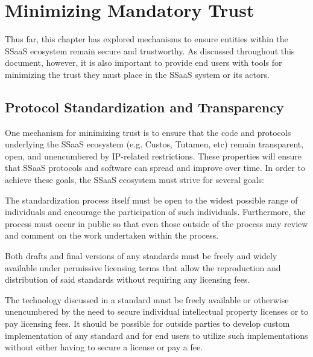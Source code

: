 \section{Minimizing Mandatory Trust}

Thus far, this chapter has explored mechanisms to ensure entities
within the SSaaS ecosystem remain secure and trustworthy. As discussed
throughout this document, however, it is also important to provide end
users with tools for minimizing the trust they must place in the SSaaS
system or its actors.

\subsection{Protocol Standardization and Transparency}

One mechanism for minimizing trust is to ensure that the code and
protocols underlying the SSaaS ecosystem (e.g. Custos, Tutamen, etc)
remain transparent, open, and unencumbered by IP-related
restrictions. These properties will ensure that SSaaS protocols and
software can spread and improve over time. In order to achieve these
goals, the SSaaS ecosystem must strive for several goals:

\begin{packed_desc}
\item[Openness of Process:] The standardization process itself must be
  open to the widest possible range of individuals and encourage the
  participation of such individuals. Furthermore, the process must
  occur in public so that even those outside of the process may review
  and comment on the work undertaken within the process.
\item[Availability of Standards:] Both drafts and final versions of
  any standards must be freely and widely available under permissive
  licensing terms that allow the reproduction and distribution of said
  standards without requiring any licensing fees.
\item[Unencumbered by Intellectual Property Restrictions:] The
  technology discussed in a standard must be freely available or
  otherwise unencumbered by the need to secure individual intellectual
  property licenses or to pay licensing fees. It should be possible
  for outside parties to develop custom implementation of any standard
  and for end users to utilize such implementations without either
  having to secure a license or pay a fee.
\end{packed_desc}

